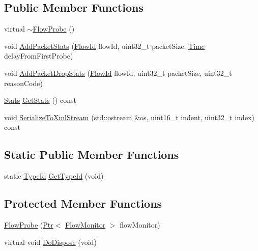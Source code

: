 \subsection*{Public Member Functions}
\begin{DoxyCompactItemize}
\item 
virtual \hyperlink{classns3_1_1FlowProbe_a202a28649a1738d417edca4f445e507f}{$\sim$\+Flow\+Probe} ()
\item 
void \hyperlink{classns3_1_1FlowProbe_a3e52f1bfd521bd3ae65e4c74b1d15257}{Add\+Packet\+Stats} (\hyperlink{group__flow-monitor_ga39a766c4a370cdb9ab8ac85da4b288e9}{Flow\+Id} flow\+Id, uint32\+\_\+t packet\+Size, \hyperlink{classns3_1_1Time}{Time} delay\+From\+First\+Probe)
\item 
void \hyperlink{classns3_1_1FlowProbe_a6c2529c13cdd4ee34b48424e60820bfc}{Add\+Packet\+Drop\+Stats} (\hyperlink{group__flow-monitor_ga39a766c4a370cdb9ab8ac85da4b288e9}{Flow\+Id} flow\+Id, uint32\+\_\+t packet\+Size, uint32\+\_\+t reason\+Code)
\item 
\hyperlink{classns3_1_1FlowProbe_a6e09fdef49c914b417bcea3bfb4ca53d}{Stats} \hyperlink{classns3_1_1FlowProbe_a1ef369a4bf10132cb09e8fb15f2b2cdf}{Get\+Stats} () const 
\item 
void \hyperlink{classns3_1_1FlowProbe_abcec5636efc4fafb59b28d105b4705f5}{Serialize\+To\+Xml\+Stream} (std\+::ostream \&os, uint16\+\_\+t indent, uint32\+\_\+t index) const 
\end{DoxyCompactItemize}
\subsection*{Static Public Member Functions}
\begin{DoxyCompactItemize}
\item 
static \hyperlink{classns3_1_1TypeId}{Type\+Id} \hyperlink{classns3_1_1FlowProbe_a42e08b64c74ddba955d7a2fd0de5e455}{Get\+Type\+Id} (void)
\end{DoxyCompactItemize}
\subsection*{Protected Member Functions}
\begin{DoxyCompactItemize}
\item 
\hyperlink{classns3_1_1FlowProbe_a3fd0db6d2fcb9409ee289e2f4afe5f46}{Flow\+Probe} (\hyperlink{classns3_1_1Ptr}{Ptr}$<$ \hyperlink{classns3_1_1FlowMonitor}{Flow\+Monitor} $>$ flow\+Monitor)
\item 
virtual void \hyperlink{classns3_1_1FlowProbe_ac5447b7e97cab0f6603b448497ecea1e}{Do\+Dispose} (void)
\end{DoxyCompactItemize}
